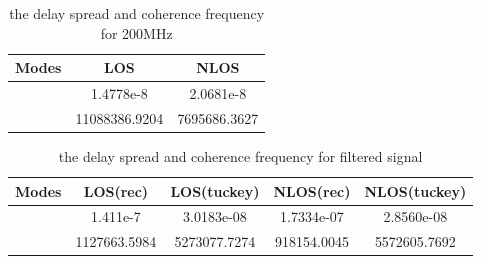 \documentclass[a4paper]{article}
\begin{document}
    	\begin{table}[h]
		\centering 
		\begin{tabular}{lcc}
			\hline
			Modes &LOS &NLOS \\
			\hline 
			\centering{ $\sigma_{\tau}$}  &1.4778e-8 &2.0681e-8 \\ 
			\hline 
			\centering{  ${\Delta}f_c($Hz$)$}  &11088386.9204 &7695686.3627 
			\\  \hline 
		\end{tabular}
		\caption{the delay spread and coherence frequency for 200MHz}
		\label{tb:ds_rec}
	\end{table}
	
	\begin{table}[h]
		\centering 
		\begin{tabular}{lcccc}
			\hline
			Modes &LOS(rec) &LOS(tuckey) &NLOS(rec) &NLOS(tuckey)\\
			\hline 
			\centering{ $\sigma_{\tau}$}  &1.411e-7 &3.0183e-08 &1.7334e-07 &2.8560e-08\\ 
			\hline 
			\centering{  ${\Delta}f_c(Hz)$}  & 1127663.5984 &5273077.7274 &918154.0045 &5572605.7692
			\\  \hline 
		\end{tabular}
		\caption{the delay spread and coherence frequency for filtered signal}
		\label{tb:coherence_f}
	\end{table}
\end{document}
